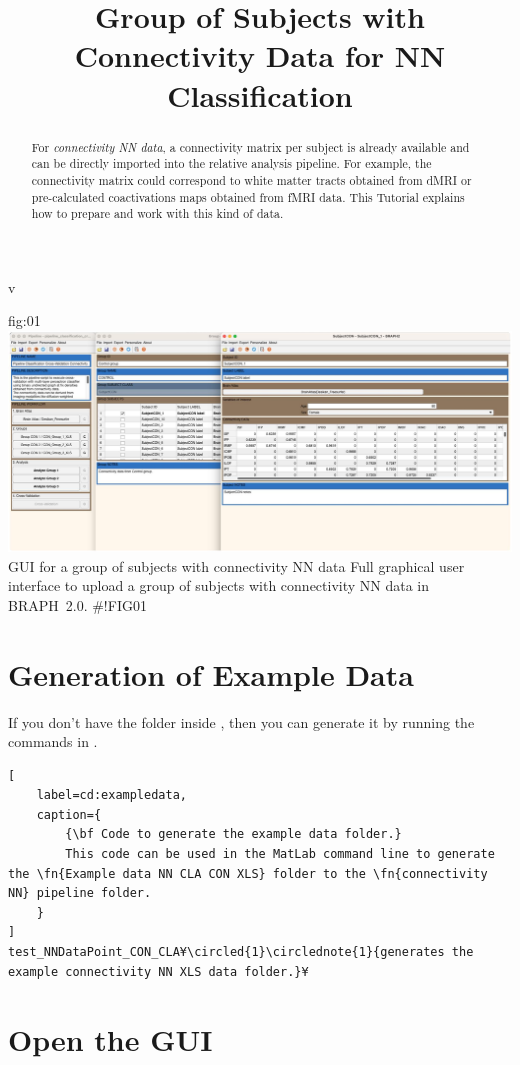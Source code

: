 v\documentclass[justified]{tufte-handout}
\title{Group of Subjects with Connectivity Data for NN Classification}
\begin{document}
\maketitle

\begin{abstract}
\noindent
For \emph{connectivity NN data}, a connectivity matrix per subject is already available and can be directly imported into the relative analysis pipeline. For example, the connectivity matrix could correspond to white matter tracts obtained from dMRI or pre-calculated coactivations maps obtained from fMRI data.
This Tutorial explains how to prepare and work with this kind of data.
\end{abstract}

\tableofcontents

	{fig:01}
	{\includegraphics{fig01.jpg}}
	{GUI for a group of subjects with connectivity NN data}
	{
	Full graphical user interface to upload a group of subjects with connectivity NN data in BRAPH~2.0. 
	}
#!FIG01

\clearpage
\section{Generation of Example Data}

If you don't have the  folder inside , then you can generate it by running the commands in .
%
\begin{lstlisting}[
	label=cd:exampledata,
	caption={
		{\bf Code to generate the example data folder.}
		This code can be used in the MatLab command line to generate the \fn{Example data NN CLA CON XLS} folder to the \fn{connectivity NN} pipeline folder.
	}
]
test_NNDataPoint_CON_CLA¥\circled{1}\circlednote{1}{generates the example connectivity NN XLS data folder.}¥
\end{lstlisting}

\section{Open the GUI}
\end{document}
